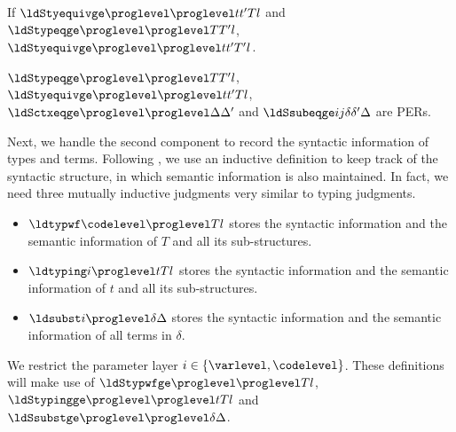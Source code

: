 \begin{lemma}
  If $\ldStyequivge \proglevel \proglevel t{t'} T l$ and $\ldStypeqge \proglevel \proglevel T{T'} l$, $\ldStyequivge \proglevel \proglevel t{t'}{T'} l$.
\end{lemma}

\begin{lemma}[PER]
  $\ldStypeqge \proglevel \proglevel T{T'} l$, $\ldStyequivge \proglevel \proglevel t{t'} T l$,
  $\ldSctxeqge \proglevel \proglevel \Delta{\Delta'}$ and $\ldSsubeqge i j \delta{\delta'}\Delta$ are
  PERs. 
\end{lemma}

Next, we handle the second component to record the syntactic information of types and terms. %
Following \citet{hu2024layered,10.1007/978-3-031-57262-3_3}, we use an inductive
definition to keep track of the syntactic structure, in which semantic information is
also maintained. %
In fact, we need three mutually inductive judgments very similar to typing judgments. %
\begin{itemize}
\item $\ldtypwf \codelevel \proglevel T l$ stores the syntactic information and the semantic
  information of $T$ and all its sub-structures.
\item $\ldtyping i \proglevel t T l$ stores the syntactic information and the semantic
  information of $t$ and all its sub-structures.
\item $\ldsubst i \proglevel \delta{\Delta}$ stores the syntactic information and the semantic
  information of all terms in $\delta$. 
\end{itemize}
We restrict the parameter layer $i \in \{\varlevel, \codelevel\}$. %
These definitions will make use of $\ldStypwfge \proglevel \proglevel T l$, $\ldStypingge \proglevel \proglevel t T l$ and
$\ldSsubstge \proglevel \proglevel \delta \Delta$. %

